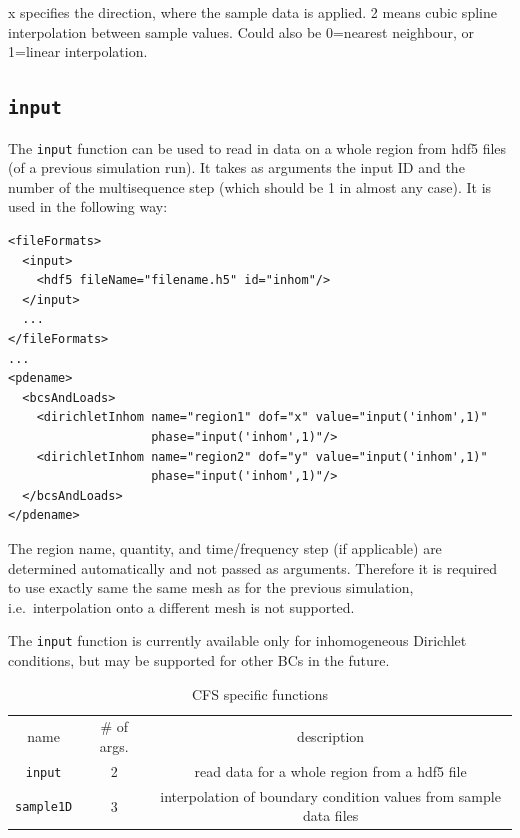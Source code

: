 \noindent
x specifies the direction, where the sample data is applied.
2 means cubic spline interpolation between sample values. 
Could also be 0=nearest neighbour, or 1=linear interpolation.

\subsection{\texttt{input}}
The \texttt{input} function can be used to read in data on a whole region from
hdf5 files (of a previous simulation run). It takes as arguments the input ID
and the number of the multisequence step (which should be 1 in almost any
case). It is used in the following way:
\begin{verbatim}
<fileFormats>
  <input>
    <hdf5 fileName="filename.h5" id="inhom"/>
  </input>
  ...
</fileFormats>
...
<pdename>
  <bcsAndLoads>
    <dirichletInhom name="region1" dof="x" value="input('inhom',1)"
                    phase="input('inhom',1)"/>
    <dirichletInhom name="region2" dof="y" value="input('inhom',1)"
                    phase="input('inhom',1)"/>
  </bcsAndLoads>
</pdename>
\end{verbatim}
The region name, quantity, and time/frequency step (if applicable) are
determined automatically and not passed as arguments. Therefore it is required
to use exactly same the same mesh as for the previous simulation, i.e.\
interpolation onto a different mesh is not supported.

The \texttt{input} function is currently available only for inhomogeneous
Dirichlet conditions, but may be supported for other BCs in the future.

\begin{table}[htb]
  \begin{longtable}{c|c|c}
    \hline\noalign{\smallskip}
    name & \# of args. & description \\
    \noalign{\smallskip}\hline\noalign{\smallskip}
    \texttt{input}      & 2 & read data for a whole region from a hdf5 file \\
    \texttt{sample1D}   & 3 & interpolation of boundary condition values
    from sample data files \\
  \end{longtable}
 \caption{CFS specific functions}
\end{table}

